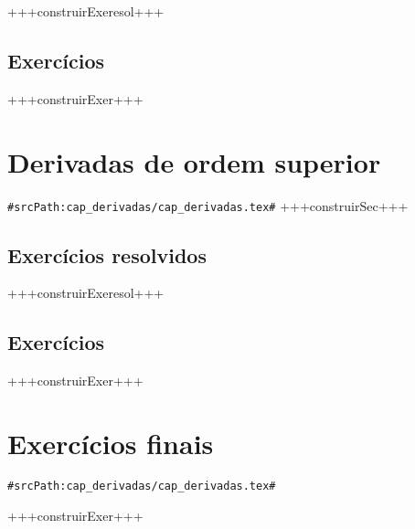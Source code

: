 +++construirExeresol+++


\subsection*{Exercícios}

+++construirExer+++


\section{Derivadas de ordem superior}
\verb+#srcPath:cap_derivadas/cap_derivadas.tex#+
+++construirSec+++

\subsection*{Exercícios resolvidos}

+++construirExeresol+++


\subsection*{Exercícios}

+++construirExer+++


\section{Exercícios finais}
\verb+#srcPath:cap_derivadas/cap_derivadas.tex#+


+++construirExer+++


